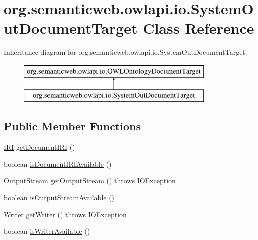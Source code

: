 \hypertarget{classorg_1_1semanticweb_1_1owlapi_1_1io_1_1_system_out_document_target}{\section{org.\-semanticweb.\-owlapi.\-io.\-System\-Out\-Document\-Target Class Reference}
\label{classorg_1_1semanticweb_1_1owlapi_1_1io_1_1_system_out_document_target}
}
Inheritance diagram for org.\-semanticweb.\-owlapi.\-io.\-System\-Out\-Document\-Target\-:\begin{figure}[H]
\begin{center}
\leavevmode
\includegraphics[height=2.000000cm]{classorg_1_1semanticweb_1_1owlapi_1_1io_1_1_system_out_document_target}
\end{center}
\end{figure}
\subsection*{Public Member Functions}
\begin{DoxyCompactItemize}
\item 
\hyperlink{classorg_1_1semanticweb_1_1owlapi_1_1model_1_1_i_r_i}{I\-R\-I} \hyperlink{classorg_1_1semanticweb_1_1owlapi_1_1io_1_1_system_out_document_target_a8e04f3e3536f1897eb94610773ad2280}{get\-Document\-I\-R\-I} ()
\item 
boolean \hyperlink{classorg_1_1semanticweb_1_1owlapi_1_1io_1_1_system_out_document_target_a03e64028ad78eee52342fb8d5eea8202}{is\-Document\-I\-R\-I\-Available} ()
\item 
Output\-Stream \hyperlink{classorg_1_1semanticweb_1_1owlapi_1_1io_1_1_system_out_document_target_aae90a7e6fce12a23678e97175d289938}{get\-Output\-Stream} ()  throws I\-O\-Exception 
\item 
boolean \hyperlink{classorg_1_1semanticweb_1_1owlapi_1_1io_1_1_system_out_document_target_a85f9cb73b57ab58733f59aad1e750bc0}{is\-Output\-Stream\-Available} ()
\item 
Writer \hyperlink{classorg_1_1semanticweb_1_1owlapi_1_1io_1_1_system_out_document_target_adb7b8340b05974c04a602069a1816363}{get\-Writer} ()  throws I\-O\-Exception 
\item 
boolean \hyperlink{classorg_1_1semanticweb_1_1owlapi_1_1io_1_1_system_out_document_target_a3f647fe0aa4ea9dbfe1e748e7994dbf6}{is\-Writer\-Available} ()
\end{DoxyCompactItemize}


